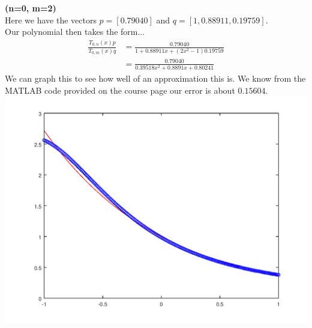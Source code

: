\documentclass[10pt]{jhwhw}
\begin{document}
	\bigbreak
	\textbf{(n=0, m=2)} \\
	Here we have the vectors $p=[0.79040]$ and $q=[1, 0.88911, 0.19759]$. \\
	Our polynomial then takes the form... \\
	\begin{align*}
		\frac{T_{0,n}(x) p}{T_{0,m}(x) q} &= \frac{0.79040}{1 + 0.88911x + (2x^2-1)0.19759} \\
		&= \frac{0.79040}{0.39518x^2 + 0.8891x + 0.80241}
	\end{align*}
	We can graph this to see how well of an approximation this is. We know from the
	MATLAB code provided on the course page our error is about $0.15604$. \\
	\includegraphics[scale=0.75]{p4a}
\end{document}
